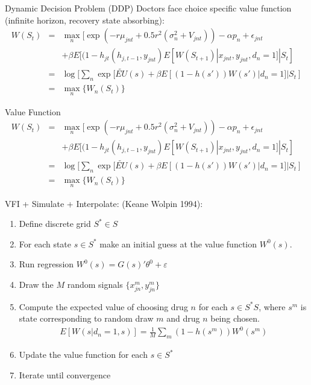 \documentclass[xcolor=pdftex,dvipsnames,table,mathserif]{beamer}
\begin{document}
\begin{frame}{Dynamic Decision Problem (DDP)}
Doctors face choice specific value function (infinite horizon, recovery state absorbing):
\begin{eqnarray*}
W(S_t) &=& \max_n [\exp(-r\mu_{jnt} + 0.5r^2(\sigma_n^2 + V_{jnt})) - \alpha p_n + \epsilon_{jnt}\\
&&+ \beta E[(1-h_{jt}(h_{j,t-1},y_{jnt}) E[W(S_{t+1}) | x_{jnt},y_{jnt},d_n=1] | S_t]\\
&=& \log [ \sum_n \exp[ \tilde{EU}(s) + \beta E[(1-h(s'))W(s') | d_n=1] | S_t] \\
&=& \max_n \{W_n(S_t)\}
\end{eqnarray*}
\end{frame}

\begin{frame}{Value Function}
\begin{eqnarray*}
W(S_t) &=& \max_n [\exp(-r\mu_{jnt} + 0.5r^2(\sigma_n^2 + V_{jnt})) - \alpha p_n + \epsilon_{jnt}\\
&&+ \beta E[(1-h_{jt}(h_{j,t-1},y_{jnt}) E[W(S_{t+1}) | x_{jnt},y_{jnt},d_n=1] | S_t]\\
&=& \log [ \sum_n \exp[ \tilde{EU}(s) + \beta E[(1-h(s'))W(s') | d_n=1] | S_t] \\
&=& \max_n \{W_n(S_t)\}
\end{eqnarray*}
\end{frame}

\begin{frame}{VFI + Simulate + Interpolate: (Keane Wolpin 1994): }
\begin{enumerate}
\item Define discrete grid $S^* \in S$
\item For each state $s \in S^*$ make an initial guess at the value function $W^0(s)$.
\item Run regression $W^0(s) = G(s)'\theta^0 + \varepsilon$
\item Draw the $M$ random signals $\{x_{jn}^m, y_{jn}^m\}$
\item Compute the expected value of choosing drug $n$ for each $s \in S^*S$, where $s^m$ is state corresponding to random draw $m$ and drug $n$ being chosen.
\begin{eqnarray*}
E[W(s | d_n =1,s)] = \frac{1}{M} \sum_m (1-h(s^m)) W^0(s^m)
\end{eqnarray*}
\item Update the value function for each $s \in S^{*}$
\item Iterate until convergence
\end{enumerate}
\end{frame}
\end{document}
